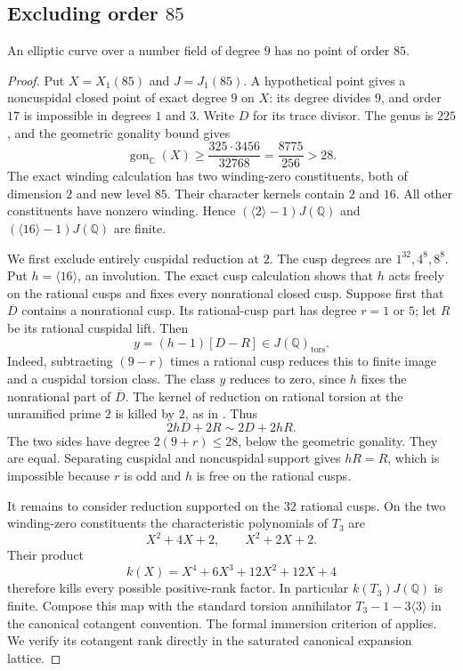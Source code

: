\subsection{Excluding order $85$}
\begin{proposition}\label{prop:nonic85-exclusion}
An elliptic curve over a number field of degree $9$ has no point of order $85$.
\end{proposition}
\begin{proof}
Put $X=X_1(85)$ and $J=J_1(85)$. A hypothetical point gives a noncuspidal closed point of exact degree $9$ on $X$: its degree divides $9$, and order $17$ is impossible in degrees $1$ and $3$. Write $D$ for its trace divisor. The genus is $225$, and the geometric gonality bound gives
\[
 \operatorname{gon}_{\mathbb C}(X)\geq\frac{325\cdot3456}{32768}
 =\frac{8775}{256}>28.
\]
The exact winding calculation has two winding-zero constituents, both of dimension $2$ and new level $85$. Their character kernels contain $2$ and $16$. All other constituents have nonzero winding. Hence $(\langle2\rangle-1)J(\mathbb Q)$ and $(\langle16\rangle-1)J(\mathbb Q)$ are finite.

We first exclude entirely cuspidal reduction at $2$. The cusp degrees are $1^{32},4^8,8^8$. Put $h=\langle16\rangle$, an involution. The exact cusp calculation shows that $h$ acts freely on the rational cusps and fixes every nonrational closed cusp. Suppose first that $\overline D$ contains a nonrational cusp. Its rational-cusp part has degree $r=1$ or $5$; let $R$ be its rational cuspidal lift. Then
\[
 y=(h-1)[D-R]\in J(\mathbb Q)_{\mathrm{tors}}.
\]
Indeed, subtracting $(9-r)$ times a rational cusp reduces this to finite image and a cuspidal torsion class. The class $y$ reduces to zero, since $h$ fixes the nonrational part of $\overline D$. The kernel of reduction on rational torsion at the unramified prime $2$ is killed by $2$, as in \cite[proof of Proposition~3.4]{DKSS}. Thus
\[
 2hD+2R\sim2D+2hR.
\]
The two sides have degree $2(9+r)\leq28$, below the geometric gonality. They are equal. Separating cuspidal and noncuspidal support gives $hR=R$, which is impossible because $r$ is odd and $h$ is free on the rational cusps.

It remains to consider reduction supported on the $32$ rational cusps. On the two winding-zero constituents the characteristic polynomials of $T_3$ are
\[
 X^2+4X+2,\qquad X^2+2X+2.
\]
Their product
\[
 k(X)=X^4+6X^3+12X^2+12X+4
\]
therefore kills every possible positive-rank factor. In particular $k(T_3)J(\mathbb Q)$ is finite. Compose this map with the standard torsion annihilator $T_3-1-3\langle3\rangle$ in the canonical cotangent convention. The formal immersion criterion of \cite[Corollaries~4.4 and~5.2, Proposition~5.3]{DKSS} applies. We verify its cotangent rank directly in the saturated canonical expansion lattice.


\end{proof}
